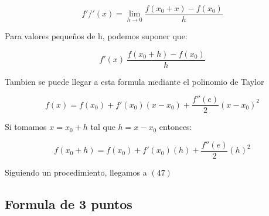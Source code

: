 \documentclass[10pt]{article}
\begin{document}
\begin{equation}
	f'/'(x) = \lim_{h\rightarrow 0} \dfrac{f(x_0 +x)-f(x_0)}{h}
\end{equation}

Para valores pequeños de h, podemos suponer que:

\begin{equation}
	f'(x)~ \dfrac{f(x_0+h)-f(x_0)}{h}
\end{equation}

Tambien se puede llegar a esta formula mediante el polinomio de Taylor

\begin{equation}
	f(x) = f(x_0) + f'(x_0)(x-x_0) + \frac{f''(e)}{2}(x-x_0)^2
\end{equation}

Si tomamos $x = x_0+h$ tal que $h = x-x_0$ entonces:

\begin{equation}
	f(x_0+h) = f(x_0)+f'(x_0)(h)+\frac{f''(e)}{2}(h)^2
\end{equation}

Siguiendo un procedimiento, llegamos a $(47)$

\subsection{Formula de 3 puntos}
\end{document}
